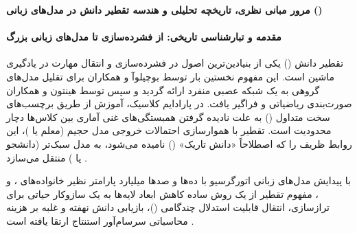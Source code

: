 \item \textbf{مرور مبانی نظری، تاریخچه تحلیلی و هندسه تقطیر دانش در مدل‌های زبانی ()}

\paragraph*{مقدمه و تبارشناسی تاریخی: از فشرده‌سازی تا مدل‌های زبانی بزرگ}
تقطیر دانش () یکی از بنیادین‌ترین اصول در فشرده‌سازی و انتقال مهارت در یادگیری ماشین است. این مفهوم نخستین بار توسط بوچیلوآ و همکاران \cite{bucilua2006model} برای تقلیل مدل‌های گروهی به یک شبکه عصبی منفرد ارائه گردید و سپس توسط هینتون و همکاران \cite{hinton2015distilling} صورت‌بندی ریاضیاتی و فراگیر یافت. در پارادایم کلاسیک، آموزش از طریق برچسب‌های سخت متداول () به علت نادیده گرفتن همبستگی‌های غنی آماری بین کلاس‌ها دچار محدودیت است. تقطیر با هموارسازی احتمالات خروجی مدل حجیم (معلم یا )، این روابط ظریف را که اصطلاحاً «دانش تاریک» () نامیده می‌شود، به مدل سبک‌تر (دانشجو یا ) منتقل می‌سازد \cite{mansourian2025comprehensive, fang2026knowledge}.

با پیدایش مدل‌های زبانی اتورگرسیو با ده‌ها و صدها میلیارد پارامتر نظیر خانواده‌های  \cite{touvron2023llama}،  \cite{yang2024qwen2, yang2025qwen3} و  \cite{deepseek2025r1, deepseek2026v4}، مفهوم تقطیر از یک روش ساده کاهش ابعاد لایه‌ها به یک سازوکار حیاتی برای ترازسازی، انتقال قابلیت استدلال چندگامی ()، بازیابی دانش نهفته و غلبه بر هزینه محاسباتی سرسام‌آور استنتاج ارتقا یافته است \cite{song2026survey, ramesh2025generalization}.

